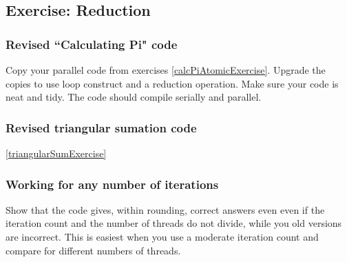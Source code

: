 \subsection{Exercise: Reduction}
\subsubsection{Revised ``Calculating Pi" code}
Copy your parallel code from exercises \ref{calcPiAtomicExercise}.  
Upgrade the copies to use loop construct and a reduction operation.  Make sure your code is neat and tidy.  The code should compile serially and parallel.

\subsubsection{Revised triangular sumation code}

\ref{triangularSumExercise}
\subsubsection{Working for any number of iterations}
Show that the code gives, within rounding, correct answers even even if the iteration count and the number of threads do not divide, while you old versions are incorrect.  This is easiest when you use a moderate iteration count and compare for different numbers of threads.

